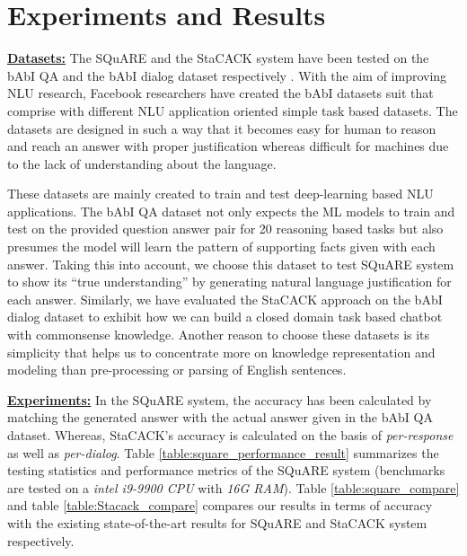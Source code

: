 \documentclass[letterpaper]{article}
\begin{document}
\section{Experiments and Results}

\noindent\textbf{\underline{Datasets:}}
The SQuARE and the StaCACK system have been tested on the bAbI QA \cite{babi} and the bAbI dialog dataset respectively \cite{babi_dialog}. With the aim of improving NLU research, Facebook researchers have created the bAbI datasets suit that comprise with different NLU application oriented simple task based datasets. The datasets are designed in such a way that it becomes easy for human to reason and reach an answer with proper justification whereas difficult for machines due to the lack of understanding about the language.

These datasets are mainly created to train and test deep-learning based NLU applications. The bAbI QA dataset not only expects the ML models to train and test on the provided question answer pair for 20 reasoning based tasks but also presumes the model will learn the pattern of supporting facts given with each answer. Taking this into account, we choose this dataset to test SQuARE system to show its ``true understanding'' by generating natural language justification for each answer. Similarly, we have evaluated the StaCACK approach on the bAbI dialog dataset to exhibit how we can build a closed domain task based chatbot with commonsense knowledge. Another reason to choose these datasets is its simplicity that helps us to concentrate more on knowledge representation and modeling than pre-processing or parsing of English sentences.

\smallskip
\noindent\textbf{\underline{Experiments:}}
In the SQuARE system, the accuracy has been calculated by matching the generated answer with the actual answer given in the bAbI QA dataset. Whereas, StaCACK's accuracy is calculated on the basis of \textit{per-response} as well as \textit{per-dialog}. Table \ref{table:square_performance_result} summarizes the testing statistics and performance metrics of the SQuARE system (benchmarks are tested on a \textit{intel i9-9900 CPU} with \textit{16G RAM}).
Table \ref{table:square_compare} and table \ref{table:Stacack_compare} compares our results in terms of accuracy with the existing state-of-the-art results for SQuARE and StaCACK system respectively.
\end{document}
